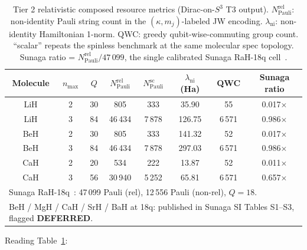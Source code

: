 \documentclass[twocolumn,pra,amsmath,amssymb,superscriptaddress]{revtex4-2}
\begin{document}
\begin{table}[h]
\caption{Tier 2 relativistic composed resource metrics (Dirac-on-$S^3$
T3 output). $N_{\mathrm{Pauli}}^{\mathrm{rel}}$: non-identity Pauli
string count in the $(\kappa, m_j)$-labeled JW encoding. $\lambda_{\mathrm{ni}}$:
non-identity Hamiltonian 1-norm. QWC: greedy qubit-wise-commuting
group count. ``scalar'' repeats the spinless benchmark at the same
molecular spec topology. Sunaga ratio = $N_{\mathrm{Pauli}}^{\mathrm{rel}} / 47\,099$,
the single calibrated Sunaga RaH-18q cell~\cite{Sunaga2025}.}
\label{tab:paper20_tier2}
\begin{ruledtabular}
\begin{tabular}{cccccccc}
Molecule & $n_{\max}$ & $Q$ & $N_{\mathrm{Pauli}}^{\mathrm{rel}}$ & $N_{\mathrm{Pauli}}^{\mathrm{sc}}$ & $\lambda_{\mathrm{ni}}$ (Ha) & QWC & Sunaga ratio \\
\hline
LiH & 2 & 30 &    805  & 333    &  35.90 &   55 & 0.017$\times$ \\
LiH & 3 & 84 & 46\,434 & 7\,878 & 126.75 & 6\,571 & 0.986$\times$ \\
BeH & 2 & 30 &    805  & 333    & 141.32 &   52 & 0.017$\times$ \\
BeH & 3 & 84 & 46\,434 & 7\,878 & 297.03 & 6\,571 & 0.986$\times$ \\
CaH & 2 & 20 &    534  & 222    &  13.87 &   52 & 0.011$\times$ \\
CaH & 3 & 56 & 30\,940 & 5\,252 &  65.81 & 6\,571 & 0.657$\times$ \\
\hline\hline
\multicolumn{8}{l}{\footnotesize Sunaga RaH-18q~\cite{Sunaga2025}: 47\,099 Pauli (rel), 12\,556 Pauli (non-rel), $Q = 18$.} \\
\multicolumn{8}{l}{\footnotesize BeH / MgH / CaH / SrH / BaH at 18q: published in Sunaga SI Tables S1--S3, flagged \textbf{DEFERRED}.} \\
\end{tabular}
\end{ruledtabular}
\end{table}

Reading Table~\ref{tab:paper20_tier2}:
\end{document}
